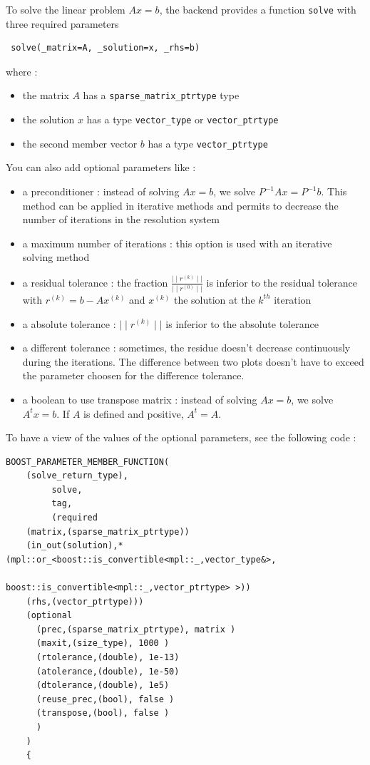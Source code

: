 To solve the linear problem $Ax=b$, the backend provides a function \lstinline!solve! with three required parameters
\begin{lstlisting}
 solve(_matrix=A, _solution=x, _rhs=b)
\end{lstlisting}
where :
\begin{itemize}
\item the matrix $A$ has a \lstinline!sparse_matrix_ptrtype! type
\item the solution $x$ has a type \lstinline!vector_type! or \lstinline!vector_ptrtype!
\item the second member vector $b$ has a type \lstinline!vector_ptrtype!
\end{itemize}
You can also add optional parameters like :
\begin{itemize}

\item a preconditioner : instead of solving $Ax=b$, we solve $P^{-1}Ax= P^{-1}b$. This method can be applied in iterative methods and permits to decrease the number of iterations in the resolution system

\item a maximum number of iterations : this option is used with an iterative solving method

\item a residual tolerance : the fraction $\displaystyle{\frac{\mid\mid r^{(k)} \mid\mid }{\mid\mid r^{(0)} \mid\mid}}$ is inferior to the residual tolerance with
$r^{(k)}=b-Ax^{(k)}$ and $x^{(k)}$ the solution at the $k^{th}$ iteration

\item a absolute tolerance : $\mid\mid r^{(k)} \mid\mid $ is inferior to the absolute tolerance

\item a different tolerance : sometimes, the residue doesn’t decrease continuously during the iterations. The difference between two plots doesn’t have to exceed the parameter choosen for the difference tolerance.

\item a boolean to use transpose matrix : instead of solving $Ax=b$, we solve $A^{t}x=b$. If $A$ is defined and positive, $A^{t}=A$.

\end{itemize}

To have a view of the values of the optional parameters, see the following code :

\begin{lstlisting}
BOOST_PARAMETER_MEMBER_FUNCTION(
	(solve_return_type),
         solve,
         tag,
         (required
	(matrix,(sparse_matrix_ptrtype))
	(in_out(solution),*(mpl::or_<boost::is_convertible<mpl::_,vector_type&>,
                                         boost::is_convertible<mpl::_,vector_ptrtype> >))
	(rhs,(vector_ptrtype)))
	(optional
	  (prec,(sparse_matrix_ptrtype), matrix )
	  (maxit,(size_type), 1000 )
	  (rtolerance,(double), 1e-13)
	  (atolerance,(double), 1e-50)
	  (dtolerance,(double), 1e5)
	  (reuse_prec,(bool), false )
	  (transpose,(bool), false )
	  )
	)
    {
\end{lstlisting}


